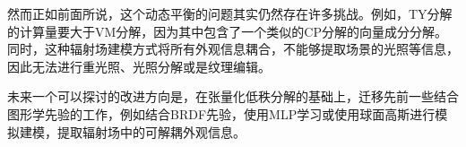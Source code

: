 \documentclass[10pt,twocolumn,letterpaper]{article}
\begin{document}
然而正如前面所说，这个动态平衡的问题其实仍然存在许多挑战。例如，TY分解的计算量要大于VM分解，因为其中包含了一个类似的CP分解的向量成分分解。同时，这种辐射场建模方式将所有外观信息耦合，不能够提取场景的光照等信息，因此无法进行重光照、光照分解或是纹理编辑。

未来一个可以探讨的改进方向是，在张量化低秩分解的基础上，迁移先前一些结合图形学先验的工作，例如结合BRDF先验，使用MLP学习或使用球面高斯进行模拟建模，提取辐射场中的可解耦外观信息。

{\small


}
\end{document}
